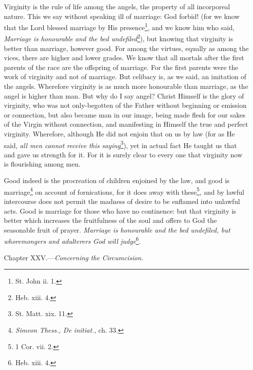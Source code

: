 Virginity is the rule of life among the angels, the property of all incorporeal nature. This we say without speaking ill of marriage: God forbid! (for we know that the Lord blessed marriage by His presence\footnote{St. John ii. 1.}, and we know him who said, \emph{Marriage is honourable and the bed undefiled}\footnote{Heb. xiii. 4.}), but knowing that virginity is better than marriage, however good. For among the virtues, equally as among the vices, there are higher and lower grades. We know that all mortals after the first parents of the race are the offspring of marriage. For the first parents were the work of virginity and not of marriage. But celibacy is, as we said, an imitation of the angels. Wherefore virginity is as much more honourable than marriage, as the angel is higher than man. But why do I say angel? Christ Himself is the glory of virginity, who was not only-begotten of the Father without beginning or emission or connection, but also became man in our image, being made flesh for our sakes of the Virgin without connection, and manifesting in Himself the true and perfect virginity. Wherefore, although He did not enjoin that on us by law (for as He said, \emph{all men cannot receive this saying}\footnote{St. Matt. xix. 11.}), yet in actual fact He taught us that and gave us strength for it. For it is surely clear to every one that virginity now is flourishing among men.

Good indeed is the procreation of children enjoined by the law, and good is marriage\footnote{\emph{Simeon Thess., De initiat., }ch. 33.} on account of fornications, for it does away with these\footnote{1 Cor. vii. 2.}, and by lawful intercourse does not permit the madness of desire to be enflamed into unlawful acts. Good is marriage for those who have no continence: but that virginity is better which increases the fruitfulness of the soul and offers to God the seasonable fruit of prayer. \emph{Marriage is honourable and the bed undefiled, but whoremongers and adulterers God will judge}\footnote{Heb. xiii. 4.}.


Chapter XXV.—\emph{Concerning the Circumcision.}

